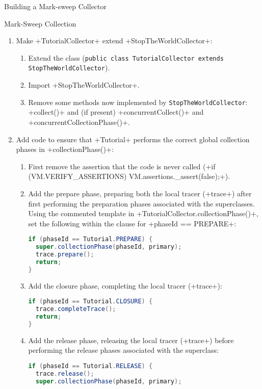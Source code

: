 \begin{chapter}{Building a Mark-sweep Collector}
\begin{section}{Mark-Sweep Collection}
\begin{enumerate}
    \begin{enumerate}
      \item Make \spverb+TutorialCollector+ extend \spverb+StopTheWorldCollector+:
        \begin{enumerate}
          \item Extend the class (\texttt{public class Tutorial\-Collector ex\-tends Stop\-The\-World\-Collector}).
          \item Import \spverb+StopTheWorldCollector+.
          \item Remove some methods now implemented by \texttt{Stop\-The\-World\-Col\-lec\-tor}: \spverb+collect()+ and (if present) \spverb+concurrentCollect()+ and \newline \spverb+concurrentCollectionPhase()+.
        \end{enumerate}
      \item Add code to ensure that \spverb+Tutorial+ performs the correct global collection phases in \spverb+collectionPhase()+:
        \begin{enumerate}
           \item First remove the assertion that the code is never called (\spverb+if (VM.VERIFY_ASSERTIONS) VM.assertions._assert(false);+).
           \item Add the prepare phase, preparing both the local tracer (\spverb+trace+) after first performing the preparation phases associated with the superclasses. Using the commented template in \spverb+TutorialCollector.collectionPhase()+, set the following within the clause for \spverb+phaseId == PREPARE+:
             \begin{lstlisting}[language=Java]
if (phaseId == Tutorial.PREPARE) {
  super.collectionPhase(phaseId, primary);
  trace.prepare();
  return;
}
             \end{lstlisting}
           \item Add the closure phase, completing the local tracer (\spverb+trace+):
             \begin{lstlisting}[language=Java]
if (phaseId == Tutorial.CLOSURE) {
  trace.completeTrace();
  return;
}
             \end{lstlisting}
           \item Add the release phase, releasing the local tracer (\spverb+trace+) before performing the release phases associated with the superclass:
             \begin{lstlisting}[language=Java]
if (phaseId == Tutorial.RELEASE) {
  trace.release();
  super.collectionPhase(phaseId, primary);

\end{lstlisting}
\end{enumerate}
\end{enumerate}
\end{enumerate}
\end{section}
\end{chapter}
